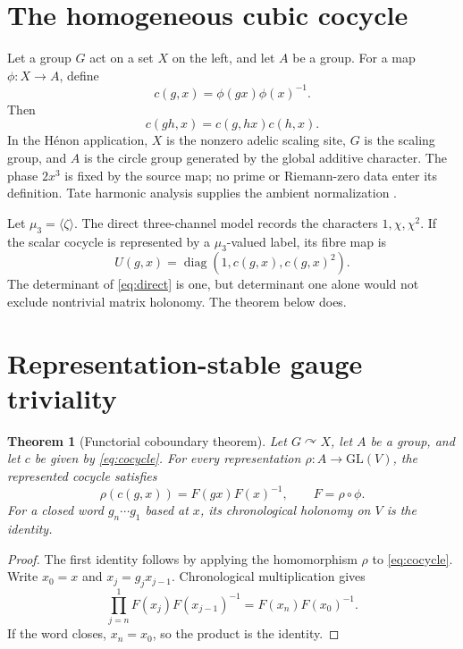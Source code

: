 \documentclass[11pt]{article}
\newtheorem{theorem}{Theorem}[section]
\theoremstyle{definition}\newtheorem{definition}[theorem]{Definition}
\theoremstyle{remark}\newtheorem{remark}[theorem]{Remark}
\begin{document}
\section{The homogeneous cubic cocycle}
Let a group \(G\) act on a set \(X\) on the left, and let \(A\) be a group.
For a map \(\phi:X\to A\), define
\begin{equation}\label{eq:cocycle}
 c(g,x)=\phi(gx)\phi(x)^{-1}.
\end{equation}
Then
\[
 c(gh,x)=c(g,hx)c(h,x).
\]
In the H\'enon application, \(X\) is the nonzero adelic scaling site,
\(G\) is the scaling group, and \(A\) is the circle group generated by the
global additive character.  The phase \(2x^3\) is fixed by the source map;
no prime or Riemann-zero data enter its definition.  Tate harmonic analysis
supplies the ambient normalization \cite{Tate1950}.

Let \(\mu_3=\langle\zeta\rangle\).  The direct three-channel model records
the characters \(1,\chi,\chi^2\).  If the scalar cocycle is represented by a
\(\mu_3\)-valued label, its fibre map is
\begin{equation}\label{eq:direct}
 U(g,x)=\operatorname{diag}(1,c(g,x),c(g,x)^2).
\end{equation}
The determinant of \eqref{eq:direct} is one, but determinant one alone would
not exclude nontrivial matrix holonomy.  The theorem below does.

\section{Representation-stable gauge triviality}
\begin{theorem}[Functorial coboundary theorem]\label{thm:main}
Let \(G\curvearrowright X\), let \(A\) be a group, and let \(c\) be given by
\eqref{eq:cocycle}.  For every representation
\(\rho:A\to\mathrm{GL}(V)\), the represented cocycle satisfies
\[
 \rho(c(g,x))=F(gx)F(x)^{-1},\qquad F=\rho\circ\phi.
\]
For a closed word \(g_n\cdots g_1\) based at \(x\), its chronological
holonomy on \(V\) is the identity.
\end{theorem}
\begin{proof}
The first identity follows by applying the homomorphism \(\rho\) to
\eqref{eq:cocycle}.  Write \(x_0=x\) and
\(x_j=g_jx_{j-1}\).  Chronological multiplication gives
\[
 \prod_{j=n}^{1}F(x_j)F(x_{j-1})^{-1}
 =F(x_n)F(x_0)^{-1}.
\]
If the word closes, \(x_n=x_0\), so the product is the identity.
\end{proof}
\end{document}
